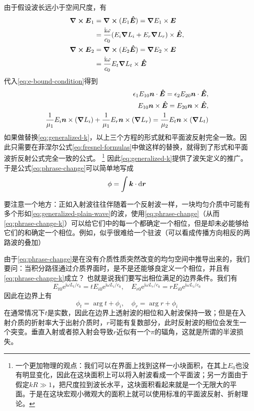 \documentclass[UTF8, a4paper]{ctexart}
\newcommand*{\ii}{\mathrm{i}}
\newcommand*{\ee}{\mathrm{e}}
\begin{document}
由于假设波长远小于空间尺度，有
\[
    \begin{aligned}
        \curl{\vb*{E}_1} &= \curl{(E_1 \vu*{E})} = \grad{E_1} \times \vb*{E} \\
        &= \frac{\ii \omega}{c_0} (E_{i} \grad{L_i} + E_{r} \grad{L_r}) \times \vu*{E}, \\
        \curl{\vb*{E}_2} &= \curl{(E_2 \vu*{E})} = \grad{E_2} \times \vb*{E} \\
        &= \frac{\ii \omega}{c_0} E_{t} \grad{L_t} \times \vu*{E}
    \end{aligned}
\]
代入\eqref{eq:e-bound-condition}得到
\[
    \begin{split}
        \epsilon_1 E_{10} \vb*{n} \cdot \vu*{E} = \epsilon_2 E_{20} \vb*{n} \cdot \vu*{E}, \\
        E_{10} \vb*{n} \times \vu*{E} = E_{20} \vb*{n} \times \vu*{E}, \\
        \frac{1}{\mu_1} E_i \vb*{n} \times (\grad{L_i}) + \frac{1}{\mu_1} E_r \vb*{n} \times (\grad{L_r}) = \frac{1}{\mu_2} E_t \vb*{n} \times (\grad{L_t})
    \end{split}
\]
如果做替换\eqref{eq:generalized-k}，以上三个方程的形式就和平面波反射完全一致。因此只需要在菲涅尔公式\eqref{eq:fresnel-formulas}中做这样的替换，就得到了形式和平面波折反射公式完全一致的公式。%
\footnote{一个更加物理的观点：我们可以在界面上找到这样一小块面积，在其上$E_0$也没有明显变化，因此在这块面积上可以将入射波看成一个平面波；另一方面由于假定$kR \gg 1$，把尺度拉到波长水平，这块面积看起来就是一个无限大的平面。于是在这块宏观小微观大的面积上就可以使用标准的平面波反射、折射理论。}
因此\eqref{eq:generalized-k}提供了波矢定义的推广。
于是公式\eqref{eq:phrase-change}可以简单地写成
\begin{equation}
    \phi = \int \vb*{k} \cdot \dd{\vb*{r}}
    \label{eq:phrase-change-k}
\end{equation}

要注意一个地方：正如入射波往往伴随着一个反射波一样，一块均匀介质中可能有多个形如\eqref{eq:generalized-plain-wave}的波，使用\eqref{eq:phrase-change}（从而\eqref{eq:phrase-change-k}）可以给它们中的每一个都确定一个相位，但是却未必能够给它们的和确定一个相位。例如，似乎很难给一个驻波（可以看成传播方向相反的两路波的叠加）

由于\eqref{eq:phrase-change}是在没有介质性质突然改变的均匀空间中推导出来的，我们要问：当积分路径通过介质界面时，是不是还能够良定义一个相位，并且有\eqref{eq:phrase-change-k}成立？
也就是说我们要写出相位满足的边界条件。我们有
\[
    E_{t0} \ee^{\ii \omega L_t / c_0} = t E_{i0} \ee^{\ii \omega L_i / c_0}, \quad E_{r0} \ee^{\ii \omega L_r / c_0} = r E_{i0} \ee^{\ii \omega L_i / c_0}
\]
因此在边界上有
\begin{equation}
    \phi_t = \arg t + \phi_i, \quad \phi_r = \arg r + \phi_i
    \label{eq:phrase-on-surface}
\end{equation}
在通常情况下$t$是实数，因此在边界上透射波的相位和入射波保持一致；但是在入射介质的折射率大于出射介质时，$r$可能有复数部分，此时反射波的相位会发生一个突变。垂直入射或者掠入射会导致$r$近似有一个$\pi$的辐角，这就是所谓的半波损失。
\end{document}
